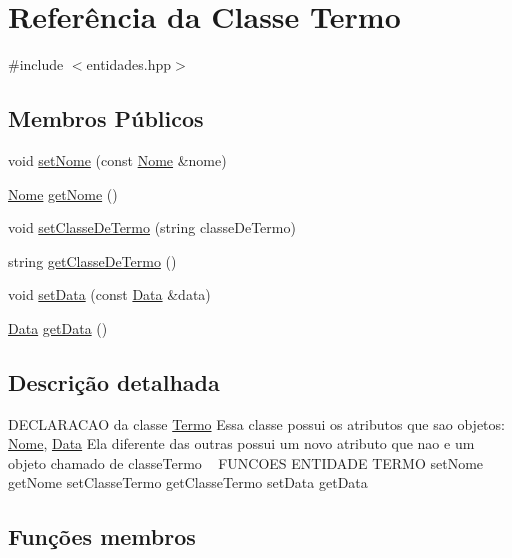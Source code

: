 \hypertarget{class_termo}{}\section{Referência da Classe Termo}
\label{class_termo}


{\ttfamily \#include $<$entidades.\+hpp$>$}

\subsection*{Membros Públicos}
\begin{DoxyCompactItemize}
\item 
void \mbox{\hyperlink{class_termo_a43246196cccd6fa074731e93ac15f07a}{set\+Nome}} (const \mbox{\hyperlink{class_nome}{Nome}} \&nome)
\item 
\mbox{\hyperlink{class_nome}{Nome}} \mbox{\hyperlink{class_termo_a5a871aa897b85c895adc9fb2329a15d5}{get\+Nome}} ()
\item 
void \mbox{\hyperlink{class_termo_a8c32e501b39e008ea369650e3eb196b1}{set\+Classe\+De\+Termo}} (string classe\+De\+Termo)
\item 
string \mbox{\hyperlink{class_termo_ae7e8fb47c8e03506b98a952fa25aa97b}{get\+Classe\+De\+Termo}} ()
\item 
void \mbox{\hyperlink{class_termo_abf829a90ed067a580bb9d4c90db0f160}{set\+Data}} (const \mbox{\hyperlink{class_data}{Data}} \&data)
\item 
\mbox{\hyperlink{class_data}{Data}} \mbox{\hyperlink{class_termo_a1357b045369299a02496810cf2db5a49}{get\+Data}} ()
\end{DoxyCompactItemize}


\subsection{Descrição detalhada}
D\+E\+C\+L\+A\+R\+A\+C\+AO da classe \mbox{\hyperlink{class_termo}{Termo}} Essa classe possui os atributos que sao objetos\+: \mbox{\hyperlink{class_nome}{Nome}}, \mbox{\hyperlink{class_data}{Data}} Ela diferente das outras possui um novo atributo que nao e um objeto chamado de classe\+Termo ~\newline
F\+U\+N\+C\+O\+ES E\+N\+T\+I\+D\+A\+DE T\+E\+R\+MO set\+Nome get\+Nome set\+Classe\+Termo get\+Classe\+Termo set\+Data get\+Data 

\subsection{Funções membros}
\mbox{\label{class_termo_ae7e8fb47c8e03506b98a952fa25aa97b}} 
